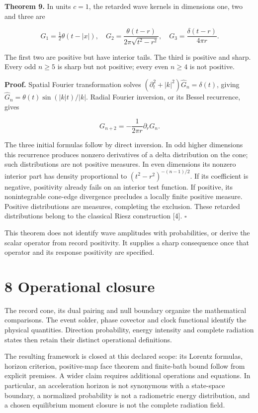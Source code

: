 \documentclass[
  11pt,
  a4paper,
]{article}
\begin{document}
\textbf{Theorem 9.} In units \(c=1\), the retarded wave kernels in dimensions one, two and three are

\[G_1=\tfrac12\theta(t-|x|),\quad
G_2=\frac{\theta(t-r)}{2\pi\sqrt{t^2-r^2}},\quad
G_3=\frac{\delta(t-r)}{4\pi r}.\]

The first two are positive but have interior tails. The third is positive and sharp. Every odd \(n\ge5\) is sharp but not positive; every even \(n\ge4\) is not positive.

\textbf{Proof.} Spatial Fourier transformation solves \((\partial_t^2+|k|^2)\widehat G_n=\delta(t)\), giving \(\widehat G_n=\theta(t)\sin(|k|t)/|k|\). Radial Fourier inversion, or its Bessel recurrence, gives

\[G_{n+2}=-\frac1{2\pi r}\partial_rG_n.\]

The three initial formulas follow by direct inversion. In odd higher dimensions this recurrence produces nonzero derivatives of a delta distribution on the cone; such distributions are not positive measures. In even dimensions its nonzero interior part has density proportional to \((t^2-r^2)^{-(n-1)/2}\). If its coefficient is negative, positivity already fails on an interior test function. If positive, its nonintegrable cone-edge divergence precludes a locally finite positive measure. Positive distributions are measures, completing the exclusion. These retarded distributions belong to the classical Riesz construction {[}4{]}. \(\square\)

This theorem does not identify wave amplitudes with probabilities, or derive the scalar operator from record positivity. It supplies a sharp consequence once that operator and its response positivity are specified.

\section{8 Operational closure}\label{operational-closure}

The record cone, its dual pairing and null boundary organize the mathematical comparisons. The event solder, phase covector and clock functional identify the physical quantities. Direction probability, energy intensity and complete radiation states then retain their distinct operational definitions.

The resulting framework is closed at this declared scope: its Lorentz formulas, horizon criterion, positive-map face theorem and finite-bath bound follow from explicit premises. A wider claim requires additional operations and equations. In particular, an acceleration horizon is not synonymous with a state-space boundary, a normalized probability is not a radiometric energy distribution, and a chosen equilibrium moment closure is not the complete radiation field.
\end{document}
